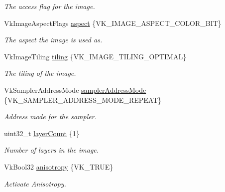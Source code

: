 \begin{DoxyCompactItemize}
\begin{DoxyCompactList}\small\item\em The access flag for the image. \end{DoxyCompactList}\item 
\mbox{\label{structblaze_1_1ImageData2D_a55550af1f0268264fb04fb7eaf56480d}} 
Vk\+Image\+Aspect\+Flags \hyperlink{structblaze_1_1ImageData2D_a55550af1f0268264fb04fb7eaf56480d}{aspect} \{V\+K\+\_\+\+I\+M\+A\+G\+E\+\_\+\+A\+S\+P\+E\+C\+T\+\_\+\+C\+O\+L\+O\+R\+\_\+\+B\+IT\}
\begin{DoxyCompactList}\small\item\em The aspect the image is used as. \end{DoxyCompactList}\item 
\mbox{\label{structblaze_1_1ImageData2D_adfa0ea846e4b9e364b0d45c781ef8e14}} 
Vk\+Image\+Tiling \hyperlink{structblaze_1_1ImageData2D_adfa0ea846e4b9e364b0d45c781ef8e14}{tiling} \{V\+K\+\_\+\+I\+M\+A\+G\+E\+\_\+\+T\+I\+L\+I\+N\+G\+\_\+\+O\+P\+T\+I\+M\+AL\}
\begin{DoxyCompactList}\small\item\em The tiling of the image. \end{DoxyCompactList}\item 
\mbox{\label{structblaze_1_1ImageData2D_a29c2f27025349b11fac19ca0f5f11e85}} 
Vk\+Sampler\+Address\+Mode \hyperlink{structblaze_1_1ImageData2D_a29c2f27025349b11fac19ca0f5f11e85}{sampler\+Address\+Mode} \{V\+K\+\_\+\+S\+A\+M\+P\+L\+E\+R\+\_\+\+A\+D\+D\+R\+E\+S\+S\+\_\+\+M\+O\+D\+E\+\_\+\+R\+E\+P\+E\+AT\}
\begin{DoxyCompactList}\small\item\em Address mode for the sampler. \end{DoxyCompactList}\item 
\mbox{\label{structblaze_1_1ImageData2D_a0cc22f822ecd4ab1841ae3f49542cc2f}} 
uint32\+\_\+t \hyperlink{structblaze_1_1ImageData2D_a0cc22f822ecd4ab1841ae3f49542cc2f}{layer\+Count} \{1\}
\begin{DoxyCompactList}\small\item\em Number of layers in the image. \end{DoxyCompactList}\item 
\mbox{\label{structblaze_1_1ImageData2D_a35383084e37ee9819799115ad2b609e8}} 
Vk\+Bool32 \hyperlink{structblaze_1_1ImageData2D_a35383084e37ee9819799115ad2b609e8}{anisotropy} \{V\+K\+\_\+\+T\+R\+UE\}
\begin{DoxyCompactList}\small\item\em Activate Anisotropy. \end{DoxyCompactList}\end{DoxyCompactItemize}


